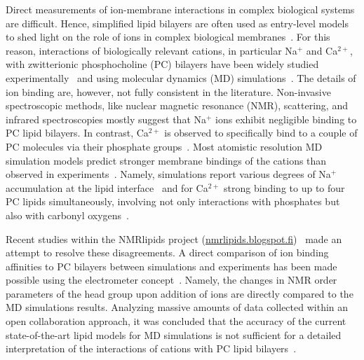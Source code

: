 \documentclass[journal=jpcbfk,manuscript=article]{achemso}
\begin{document}
Direct measurements of ion-membrane interactions in complex biological systems are difficult. 
Hence, simplified lipid bilayers are often used as entry-level models to shed light on the role of ions in complex biological membranes~\cite{scherer87,seelig90,cevc90}. 
For this reason, interactions of biologically relevant cations, in particular Na$^+$ and Ca$^{2+}$, with zwitterionic phosphocholine (PC) bilayers have been widely studied experimentally~\cite{akutsu81, altenbach84, seelig90, cevc90, tocanne90, binder02, pabst07, uhrikova08} and using molecular dynamics (MD)
simulations~\cite{bockmann03, bockmann04, sachs04, berkowitz06, cordomi08,cordomi09,vacha09a,valley11,Berkowitz12,knecht13, melcrova16, javanainen17}.
The details of ion binding are, however, not fully consistent in the literature. Non-invasive spectroscopic methods, like nuclear magnetic resonance (NMR), scattering, and infrared spectroscopies mostly suggest that Na$^+$ ions exhibit negligible binding to PC lipid bilayers. In contrast, Ca$^{2+}$ is observed to specifically bind to a couple of PC molecules via their phosphate groups~\cite{hauser76, hauser78, herbette84, akutsu81, altenbach84, binder02, pabst07, uhrikova08}. Most atomistic resolution MD simulation models predict stronger membrane bindings of the cations than observed in experiments~\cite{catte16}. Namely, simulations report various degrees of Na$^+$ accumulation at the lipid interface~\cite{bockmann03} and for Ca$^{2+}$ strong binding to up to four PC lipids simultaneously, involving not only interactions with phosphates but also with carbonyl oxygens~\cite{bockmann04, melcrova16, javanainen17}.

Recent studies within the NMRlipids project (\url{nmrlipids.blogspot.fi})~\cite{catte16} made an attempt to resolve these disagreements. A direct comparison of ion binding affinities to PC bilayers between simulations and experiments has been made possible using the electrometer concept~\cite{seelig87}. Namely, the changes in NMR order parameters of the head group upon addition of ions are directly compared to the MD simulations results. 
Analyzing massive amounts of data collected within an open collaboration approach, 
it was concluded that the accuracy of the current state-of-the-art lipid models for MD simulations is not sufficient for a detailed interpretation of the interactions of cations with PC lipid bilayers~\cite{catte16}.
\end{document}
